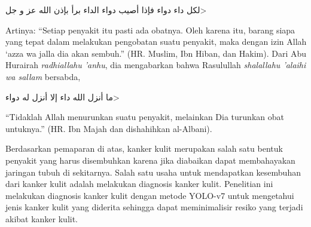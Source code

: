     \begin{flushright}
        \<لكل داء دواء فإذا أصيب دواء الداء برأ بإذن الله عز و جل>
    \end{flushright}

    Artinya: “Setiap penyakit itu pasti ada obatnya. Oleh karena itu, barang siapa yang tepat dalam melakukan pengobatan suatu penyakit, maka dengan izin Allah ‘azza wa  jalla dia akan sembuh.” (HR. Muslim, Ibn Hiban, dan Hakim). Dari Abu Hurairah \textit{radhiallahu 'anhu}, dia mengabarkan bahwa Rasulullah \textit{shalallahu 'alaihi wa sallam} bersabda,

    \begin{flushright}
        \<ما أنزل الله داء إلا أنزل له دواء>
    \end{flushright}

    “Tidaklah Allah menurunkan suatu penyakit, melainkan Dia turunkan obat untuknya.” (HR. Ibn Majah dan dishahihkan al-Albani).

    Berdasarkan pemaparan di atas, kanker kulit merupakan salah satu bentuk penyakit yang harus disembuhkan karena jika diabaikan dapat membahayakan jaringan tubuh di sekitarnya. Salah satu usaha untuk mendapatkan kesembuhan dari kanker kulit adalah melakukan diagnosis kanker kulit. Penelitian ini melakukan diagnosis kanker kulit dengan metode YOLO-v7 untuk mengetahui jenis kanker kulit yang diderita sehingga dapat meminimalisir resiko yang terjadi akibat kanker kulit.








